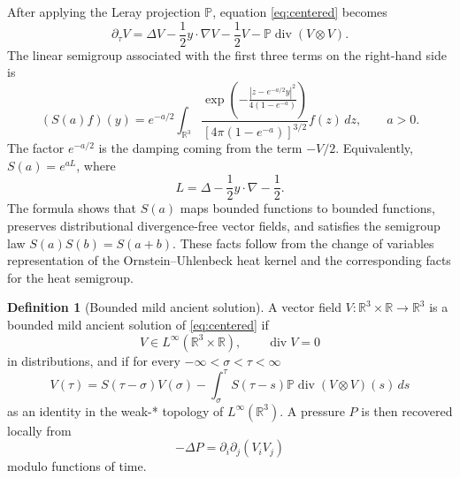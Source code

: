 \documentclass[11pt]{amsart}
\theoremstyle{plain}
\theoremstyle{definition}
\newtheorem{definition}[theorem]{Definition}
\theoremstyle{remark}
\numberwithin{equation}{section}
\begin{document}
After applying the Leray projection \(\mathbb P\), equation
\eqref{eq:centered} becomes
\begin{equation}\label{eq:projected}
   \partial_\tau V=
   \Delta V-\frac12 y\cdot\nabla V-\frac12 V
   -\mathbb P\operatorname{div}(V\otimes V).
\end{equation}
The linear semigroup associated with the first three terms on the right-hand
side is
\begin{equation}\label{eq:OU-semigroup}
   (S(a)f)(y)
   =
   e^{-a/2}
   \int_{\mathbb R^3}
   \frac{\exp\!\left(-\frac{|z-e^{-a/2}y|^2}{4(1-e^{-a})}\right)}
        {[4\pi(1-e^{-a})]^{3/2}}
   f(z)\,dz,
   \qquad a>0.
\end{equation}
The factor \(e^{-a/2}\) is the damping coming from the term \(-V/2\).
Equivalently, \(S(a)=e^{aL}\), where
\[
   L=\Delta-\frac12y\cdot\nabla-\frac12 .
\]
The formula shows that \(S(a)\) maps bounded functions to bounded functions,
preserves distributional divergence-free vector fields, and satisfies the
semigroup law \(S(a)S(b)=S(a+b)\).  These facts follow from the change of
variables representation of the Ornstein--Uhlenbeck heat kernel and the
corresponding facts for the heat semigroup.

\begin{definition}[Bounded mild ancient solution]\label{def:mild}
A vector field \(V:\mathbb R^3\times\mathbb R\to\mathbb R^3\) is a bounded mild ancient solution of
\eqref{eq:centered} if
\[
   V\in L^\infty(\mathbb R^3\times\mathbb R),\qquad \operatorname{div} V=0
\]
in distributions, and if for every \(-\infty<\sigma<\tau<\infty\)
\begin{equation}\label{eq:mild}
   V(\tau)
   =
   S(\tau-\sigma)V(\sigma)
   -
   \int_\sigma^\tau
   S(\tau-s)\mathbb P\operatorname{div}(V\otimes V)(s)\,ds
\end{equation}
as an identity in the weak-* topology of \(L^\infty(\mathbb R^3)\).  A pressure
\(P\) is then recovered locally from
\[
   -\Delta P=\partial_i\partial_j(V_iV_j)
\]
modulo functions of time.
\end{definition}
\end{document}
